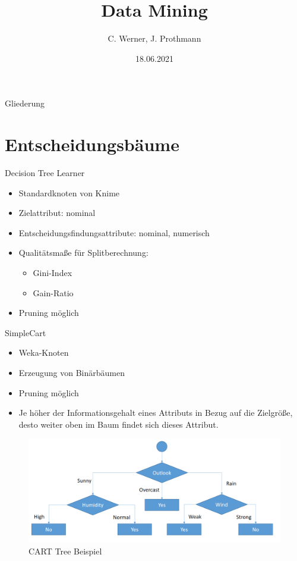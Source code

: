 \documentclass[
	handout,
  	aspectratio=169
]{beamer}
\title[Semesterprojekt KNIME]{Data Mining}
\date{18.06.2021}
\author[C. Werner, J. Prothmann]{C. Werner, J. Prothmann}
\institute{Bereich Elektrotechnik und Informatik}
\begin{document}
	\begin{frame}[plain]
		\titlepage
	\end{frame}

	\begin{frame}[allowframebreaks]{Gliederung}
		\tableofcontents
	\end{frame}
		
	\section{Entscheidungsbäume}	
		\begin{frame}{Decision Tree Learner}
			\begin{itemize}
				\item Standardknoten von Knime
				\item Zielattribut: nominal
				\item Entscheidungsfindungsattribute: nominal, numerisch
				\item Qualitätsmaße für Splitberechnung:
				\begin{itemize}
					\item Gini-Index
					\item Gain-Ratio
				\end{itemize}
				\item Pruning möglich
			\end{itemize}
		\end{frame}

		\begin{frame}{SimpleCart}	
			\begin{itemize}
				\item Weka-Knoten
				\item Erzeugung von Binärbäumen
				\item Pruning möglich
				\item Je höher der Informationsgehalt eines Attributs in Bezug auf die Zielgröße, desto weiter oben im Baum findet
sich dieses Attribut. 
			\end{itemize}
			\begin{center}
				\begin{figure}[h]
					\includegraphics[scale=0.2]{../pictures/cart-tree.png}
					\caption{CART Tree Beispiel}		
				\end{figure}		
			\end{center}
		\end{frame}
\end{document}
